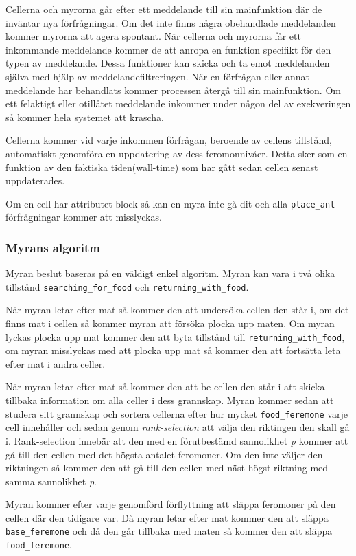 \documentclass[12pt]{article}
\begin{document}
Cellerna och myrorna går efter ett meddelande till sin mainfunktion där de inväntar nya förfrågningar.
Om det inte finns några obehandlade meddelanden kommer myrorna att agera spontant.
När cellerna och myrorna får ett inkommande meddelande kommer de att anropa en funktion specifikt för den typen av meddelande.
Dessa funktioner kan skicka och ta emot meddelanden själva med hjälp av meddelandefiltreringen.
När en förfrågan eller annat meddelande har behandlats kommer processen återgå till sin mainfunktion.
Om ett felaktigt eller otillåtet meddelande inkommer under någon del av exekveringen så kommer hela systemet att krascha.

Cellerna kommer vid varje inkommen förfrågan,
beroende av cellens tillstånd,
automatiskt genomföra en uppdatering av dess feromonnivåer.
Detta sker som en funktion av den faktiska tiden(wall-time) som har gått sedan cellen senast uppdaterades.

Om en cell har attributet block så kan en myra inte gå dit och alla \texttt{place\_ant} förfrågningar kommer att misslyckas.

\subsubsection{Myrans algoritm}
Myran beslut baseras på en väldigt enkel algoritm.
Myran kan vara i två olika tillstånd \texttt{searching\_for\_food} och \texttt{returning\_with\_food}.

När myran letar efter mat så kommer den att undersöka cellen den står i,
om det finns mat i cellen så kommer myran att försöka plocka upp maten.
Om myran lyckas plocka upp mat kommer den att byta tillstånd till \texttt{returning\_with\_food},
om myran misslyckas med att plocka upp mat så kommer den att fortsätta leta efter mat i andra celler.

När myran letar efter mat så kommer den att be cellen den står i att skicka tillbaka information om alla celler i dess grannskap.
Myran kommer sedan att studera sitt grannskap och sortera cellerna efter hur mycket \texttt{food\_feremone} varje cell innehåller och sedan genom \textit{rank-selection} att välja den riktingen den skall gå i.
Rank-selection innebär att den med en förutbestämd sannolikhet \textit{p} kommer att gå till den cellen med det högsta antalet feromoner.
Om den inte väljer den riktningen så kommer den att gå till den cellen med näst högst riktning med samma sannolikhet \textit{p}.

Myran kommer efter varje genomförd förflyttning att släppa feromoner på den cellen där den tidigare var.
Då myran letar efter mat kommer den att släppa \texttt{base\_feremone} och då den går tillbaka med maten så kommer den att släppa \texttt{food\_feremone}.
\end{document}
